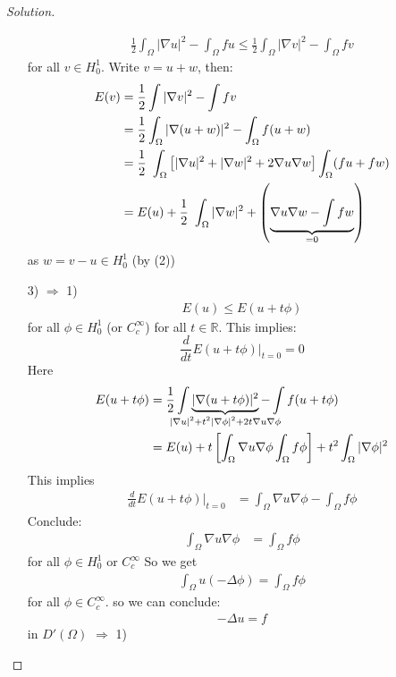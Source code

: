 \documentclass{report}
\theoremstyle{tommy}
\begin{document}
\begin{proof}[Solution]
\begin{itemize}
      \begin{align*}
        \frac{1}{2} \int_\Omega |\nabla u|^2 - \int_\Omega f u \le \frac{1}{2} \int_\Omega |\nabla v|^2 - \int_\Omega f v 
      \end{align*}  
      for all \(v \in H_0^1\). Write \(v = u + w\), then:
      \begin{align*}
        E(v) &= \frac{1}{2} \int |\nabla v|^2 - \int f v \\
        &= \frac{1}{2} \int_\Omega |\nabla (u + w)|^2 - \int_\Omega f (u + w) \\
        &= \frac{1}{2} \int_\Omega \left[|\nabla u|^2 + |\nabla w|^2 + 2 \nabla u \nabla w\right] \int_\Omega(fu + fw)\\
        &= E(u) + \frac{1}{2} \int_\Omega|\nabla w|^2 + \left(\underbrace{\nabla u \nabla w - \int f w}_{\smash{= 0}}\right)
      \end{align*}
      as \(w = v-u \in H_0^1\) (by (2))
      \item[3) \(\Rightarrow\) 1)] 
      \begin{align*}
        E(u) \le E(u + t\phi)
      \end{align*}  
      for all \(\phi \in H_0^1\) (or \(C_c^\infty\)) for all \(t \in \mathbb{R}\). This implies:
      \[\frac{d}{dt} E(u + t \phi)|_{t = 0} = 0\]
      Here 
      \begin{align*}
        E(u + t \phi) &= \frac{1}{2} \int \underbrace{|\nabla ( u + t \phi)|^2}_{\mathclap{|\nabla u|^2 + t^2 |\nabla \phi|^2 + 2 t \nabla u \nabla \phi}} - \int f(u + t \phi) \\
        &= E(u) + t \left[\int_\Omega \nabla u \nabla \phi \int_\Omega f \phi\right] + t^2 \int_\Omega |\nabla \phi|^2
      \end{align*}
      This implies
      \begin{align*}
        \frac{d}{dt} E(u + t \phi)|_{t = 0} &= \int_\Omega \nabla u \nabla \phi - \int_\Omega f \phi
      \end{align*}
      Conclude:
      \begin{align*}
        \int_\Omega \nabla u \nabla \phi &= \int_\Omega f \phi 
      \end{align*}
      for all \(\phi \in H_0^1\) or \(C_c^\infty\) So we get 
      \begin{align*}
        \int_\Omega u (- \Delta \phi) = \int_\Omega f \phi
      \end{align*}
      for all \(\phi \in C_c^\infty\). so we can conclude:
      \begin{align*}
        - \Delta u = f 
      \end{align*}
      in \(D'(\Omega)\) \(\Rightarrow\) 1)
    \end{itemize}
  \end{proof}
\end{document}
